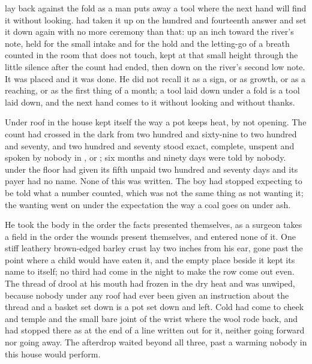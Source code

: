 
 lay back against the fold as a man puts away a tool where the next hand will find it without looking.  had taken it up on the hundred and fourteenth answer and set it down again with no more ceremony than that: up an inch toward the river's note, held for the small intake and for the hold and the letting-go of a breath counted in the room that does not touch, kept at that small height through the little silence after the count had ended, then down on the river's second low note. It was placed and it was done. He did not recall it as a sign, or as growth, or as a reaching, or as the first thing of a month; a tool laid down under a fold is a tool laid down, and the next hand comes to it without looking and without thanks.

Under  roof in  the house kept itself the way a pot keeps heat, by not opening. The count had crossed in the dark from two hundred and sixty-nine to two hundred and seventy, and two hundred and seventy stood exact, complete, unspent and spoken by nobody in ,  or ; six months and ninety days were told by nobody.  under the floor had given its fifth unpaid two hundred and seventy days and its payer had no name. None of this was written. The boy had stopped expecting to be told what a number counted, which was not the same thing as not wanting it; the wanting went on under the expectation the way a coal goes on under ash.

He took the body in the order the facts presented themselves, as a surgeon takes a field in the order the wounds present themselves, and entered none of it. One stiff leathery brown-edged barley crust lay two inches from his ear, gone past the point where a child would have eaten it, and the empty place beside it kept its name to itself; no third had come in the night to make the row come out even. The thread of drool at his mouth had frozen in the dry heat and was unwiped, because nobody under any roof had ever been given an instruction about the thread and a basket set down is a pot set down and left. Cold had come to cheek and temple and the small bare joint of the wrist where the wool rode back, and had stopped there as at the end of a line written out for it, neither going forward nor going away. The afterdrop waited beyond all three, past a warming nobody in this house would perform.

